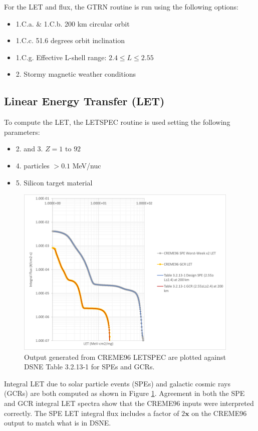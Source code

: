 \documentclass{hitec}
\begin{document}
For the LET and flux, the \textsf{GTRN} routine is run using the following options:
\begin{itemize}
	\item 1.C.a. \& 1.C.b. 200 km circular orbit
	\item 1.C.c. 51.6 degrees orbit inclination
	\item 1.C.g. Effective L-shell range: $2.4 \le L \le 2.55$
	\item 2. Stormy magnetic weather conditions
\end{itemize}

\subsection{Linear Energy Transfer (LET)}\label{ssec:LET}

To compute the LET, the \textsf{LETSPEC} routine is used setting the following parameters:
\begin{itemize}
	\item 2. and 3. $Z = 1 \text{ to } 92$
	\item 4. particles $> 0.1 $ MeV/nuc
	\item 5. Silicon target material
\end{itemize}
\begin{figure}[htbp!]
	\centering
	\includegraphics[width=0.95\textwidth]{DSNE_LET_Comparison.png}
	\caption{Output generated from CREME96 \textsf{LETSPEC} are plotted against DSNE Table 3.2.13-1 for SPEs and GCRs.}\label{fig:DSNE_LET_Comparison}
\end{figure}

Integral LET due to solar particle events (SPEs) and galactic cosmic rays (GCRs) are both computed as shown in Figure \ref{fig:DSNE_LET_Comparison}. Agreement in both the SPE and GCR integral LET spectra show that the CREME96 inputs were interpreted correctly. The SPE LET integral flux includes a factor of $2\textbf{x}$ on the CREME96 output to match what is in DSNE.
\end{document}
